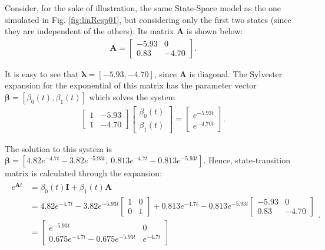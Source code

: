 \documentclass[a4paper,11pt]{book}
\numberwithin{figure}{chapter}
\numberwithin{equation}{chapter}
\numberwithin{table}{chapter}
\theoremstyle{definition}
\newtheorem{example}{Example}[chapter]
\newcounter{boxed-theorem}
\newcounter{boxed-definition}
\newcounter{boxed-example}
\newenvironment{boxed-example}[1]
{\colorlet{shadecolor}{pastelRed!20} \begin{shaded} \begin{example}{#1}}
{\end{example} \end{shaded}}
\begin{document}
\begin{boxed-example}{} \label{ex:stateTrans}
	Consider, for the sake of illustration, the same State-Space model as the one simulated in Fig. \ref{fig:linResp01}, but considering only the first two states (since they are independent of the others). Its matrix $\bm{A}$ is shown below:
	\begin{align} \label{eq:stateRespEx01}
	    \bm{A} = \begin{bmatrix} 
	        -5.93  &        0 \\
	        0.83   &  -4.70 
	    \end{bmatrix}
	.\end{align}
	
\noindent It is easy to see that $\bm{\lambda} = [-5.93, -4.70]$, since $\bm{A}$ is diagonal. The Sylvester expansion for the exponential of this matrix has the parameter vector $\bm{\beta} = [\beta_0(t), \beta_1(t)]$ which solves the system
	\begin{align}
	\begin{bmatrix}
		1 & -5.93 \\ 1 & -4.70
	\end{bmatrix} \begin{bmatrix}
		\beta_0(t) \\ \beta_1(t)
	\end{bmatrix} = \begin{bmatrix}
		e^{-5.93 t} \\ e^{-4.70 t}
	\end{bmatrix}
	.\end{align}
	
	\noindent The solution to this system is $\bm{\beta} = [4.82e^{-4.7t}-3.82e^{-5.93t},\ 0.813e^{-4.7t} - 0.813e^{-5.93t}]$. Hence, state-transition matrix is calculated through the expansion:
	\begin{align}
	\begin{split}
		e^{\bm{A} t} & = \beta_0(t) \bm{I} + \beta_1(t) \bm{A} \\ & = 4.82e^{-4.7t}-3.82e^{-5.93t} \begin{bmatrix} 1 & 0 \\ 0 & 1 \end{bmatrix} + 0.813e^{-4.7t}-0.813e^{-5.93t} \begin{bmatrix} -5.93  & 0 \\ 0.83  & -4.70 \end{bmatrix} \\
		& =  \begin{bmatrix} e^{-5.93t} & 0 \\ 0.675e^{-4.7t} - 0.675e^{-5.93t} & e^{-4.7t} \end{bmatrix} \\
	\end{split}
	.\end{align}
\end{boxed-example}
\end{document}
